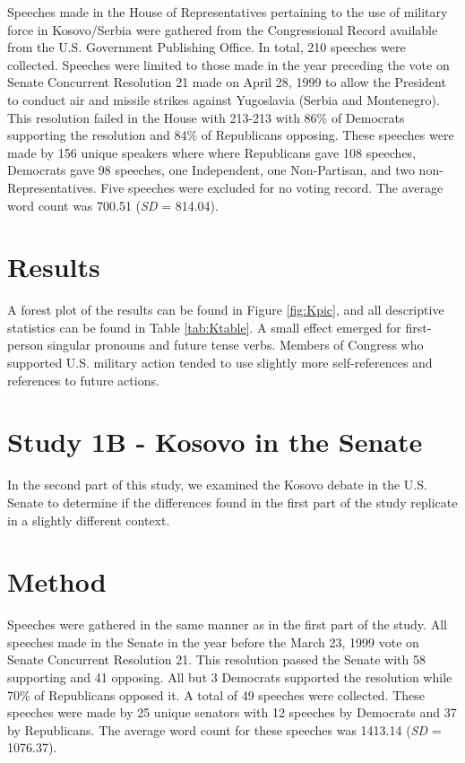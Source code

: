 \documentclass[english,man]{apa6}
\theoremstyle{definition}
\theoremstyle{definition}
\theoremstyle{definition}
\theoremstyle{remark}
\begin{document}
Speeches made in the House of Representatives pertaining to the use of
military force in Kosovo/Serbia were gathered from the Congressional
Record available from the U.S. Government Publishing Office. In total,
210 speeches were collected. Speeches were limited to those made in the
year preceding the vote on Senate Concurrent Resolution 21 made on April
28, 1999 to allow the President to conduct air and missile strikes
against Yugoslavia (Serbia and Montenegro). This resolution failed in
the House with 213-213 with 86\% of Democrats supporting the resolution
and 84\% of Republicans opposing. These speeches were made by 156 unique
speakers where where Republicans gave 108 speeches, Democrats gave 98
speeches, one Independent, one Non-Partisan, and two
non-Representatives. Five speeches were excluded for no voting record.
The average word count was 700.51 (\emph{SD} = 814.04).

\section{Results}\label{results}

A forest plot of the results can be found in Figure \ref{fig:Kpic}, and
all descriptive statistics can be found in Table \ref{tab:Ktable}. A
small effect emerged for first-person singular pronouns and future tense
verbs. Members of Congress who supported U.S. military action tended to
use slightly more self-references and references to future actions.

\section{Study 1B - Kosovo in the
Senate}\label{study-1b---kosovo-in-the-senate}

In the second part of this study, we examined the Kosovo debate in the
U.S. Senate to determine if the differences found in the first part of
the study replicate in a slightly different context.

\section{Method}\label{method-2}

Speeches were gathered in the same manner as in the first part of the
study. All speeches made in the Senate in the year before the March 23,
1999 vote on Senate Concurrent Resolution 21. This resolution passed the
Senate with 58 supporting and 41 opposing. All but 3 Democrats supported
the resolution while 70\% of Republicans opposed it. A total of 49
speeches were collected. These speeches were made by 25 unique senators
with 12 speeches by Democrats and 37 by Republicans. The average word
count for these speeches was 1413.14 (\emph{SD} = 1076.37).
\end{document}
